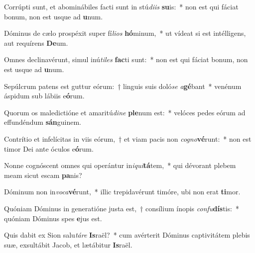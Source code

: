 \item Corrúpti sunt, et abominábiles facti sunt in stú\textit{di}\textit{is} \textbf{su}is:~* non est qui fáciat bonum, non est usque ad \textbf{u}num.
\item Dóminus de cælo prospéxit super fí\textit{li}\textit{os} \textbf{hó}minum,~* ut vídeat si est intélligens, aut requírens \textbf{De}um.
\item Omnes declinavérunt, simul inú\textit{ti}\textit{les} \textbf{fac}ti sunt:~* non est qui fáciat bonum, non est usque ad \textbf{u}num.
\item Sepúlcrum patens est guttur eórum:~† linguis suis doló\textit{se} \textit{a}\textbf{gé}bant~* venénum áspidum sub lábiis e\textbf{ó}rum.
\item Quorum os maledictióne et amaritú\textit{di}\textit{ne} \textbf{ple}num est:~* velóces pedes eórum ad effundéndum \textbf{sán}guinem.
\item Contrítio et infelícitas in viis eórum,~† et viam pacis non \textit{co}\textit{gno}\textbf{vé}runt:~* non est timor Dei ante óculos e\textbf{ó}rum.
\item Nonne cognóscent omnes qui operántur in\textit{i}\textit{qui}\textbf{tá}tem,~* qui dévorant plebem meam sicut escam \textbf{pa}nis?
\item Dóminum non in\textit{vo}\textit{ca}\textbf{vé}runt,~* illic trepidavérunt timóre, ubi non erat \textbf{ti}mor.
\item Quóniam Dóminus in generatióne justa est,~† consílium ínopis \textit{con}\textit{fu}\textbf{dís}tis:~* quóniam Dóminus spes \textbf{e}jus est.
\item Quis dabit ex Sion salu\textit{tá}\textit{re} \textbf{Is}raël?~* cum avérterit Dóminus captivitátem plebis suæ, exsultábit Jacob, et lætábitur \textbf{Is}raël.
